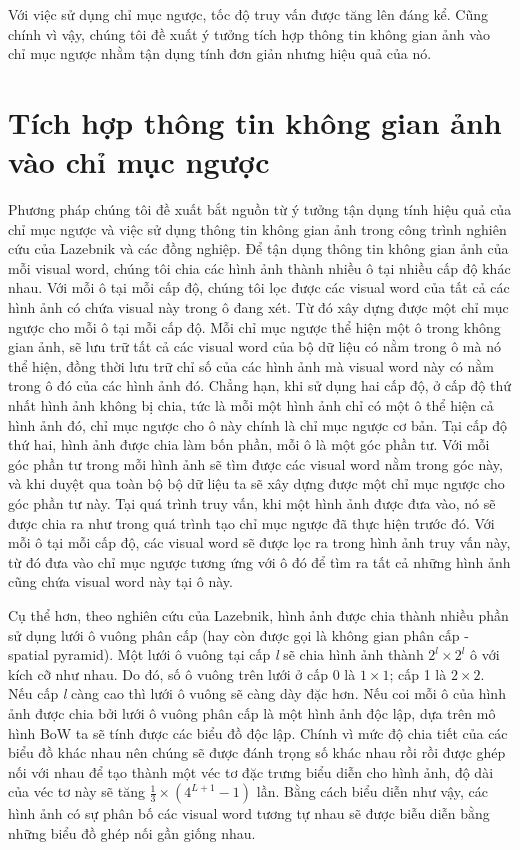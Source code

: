 Với việc sử dụng chỉ mục ngược, tốc độ truy vấn được tăng lên đáng kể. Cũng chính vì vậy, chúng tôi đề xuất ý tưởng tích hợp thông tin không gian ảnh vào chỉ mục ngược nhằm tận dụng tính đơn giản nhưng hiệu quả của nó.

\section{Tích hợp thông tin không gian ảnh vào chỉ mục ngược}
\label{sec:intergrated}
Phương pháp chúng tôi đề xuất bắt nguồn từ ý tưởng tận dụng tính hiệu quả của chỉ mục ngược và việc sử dụng thông tin không gian ảnh trong công trình nghiên cứu của Lazebnik và các đồng nghiệp\cite{lazebnik2006beyond}. Để tận dụng thông tin không gian ảnh của mỗi visual word, chúng tôi chia các hình ảnh thành nhiều ô tại nhiều cấp độ khác nhau. Với mỗi ô tại mỗi cấp độ, chúng tôi lọc được các visual word của tất cả các hình ảnh có chứa visual này trong ô đang xét. Từ đó xây dựng được một chỉ mục ngược cho mỗi ô tại mỗi cấp độ. Mỗi chỉ mục ngược thể hiện một ô trong không gian ảnh, sẽ lưu trữ tất cả các visual word của bộ dữ liệu có nằm trong ô mà nó thể hiện, đồng thời lưu trữ chỉ số của các hình ảnh mà visual word này có nằm trong ô đó của các hình ảnh đó. Chẳng hạn, khi sử dụng hai cấp độ, ở cấp độ thứ nhất hình ảnh không bị chia, tức là mỗi một hình ảnh chỉ có một ô thể hiện cả hình ảnh đó, chỉ mục ngược cho ô này chính là chỉ mục ngược cơ bản. Tại cấp độ thứ hai, hình ảnh được chia làm bốn phần, mỗi ô là một góc phần tư. Với mỗi góc phần tư trong mỗi hình ảnh sẽ tìm được các visual word nằm trong góc này, và khi duyệt qua toàn bộ bộ dữ liệu ta sẽ xây dựng được một chỉ mục ngược cho góc phần tư này. Tại quá trình truy vấn, khi một hình ảnh được đưa vào, nó sẽ được chia ra như trong quá trình tạo chỉ mục ngược đã thực hiện trước đó. Với mỗi ô tại mỗi cấp độ, các visual word sẽ được lọc ra trong hình ảnh truy vấn này, từ đó đưa vào chỉ mục ngược tương ứng với ô đó để tìm ra tất cả những hình ảnh cũng chứa visual word này tại ô này. 

Cụ thể hơn, theo nghiên cứu của Lazebnik, hình ảnh được chia thành nhiều phần sử dụng lưới ô vuông phân cấp (hay còn được gọi là không gian phân cấp - spatial pyramid). Một lưới ô vuông tại cấp \textit{l} sẽ chia hình ảnh thành $2^l \times 2^l$ ô với kích cỡ như nhau. Do đó, số ô vuông trên lưới ở cấp 0 là $1 \times 1$; cấp 1 là $2 \times 2$. Nếu cấp \textit{l} càng cao thì lưới ô vuông sẽ càng dày đặc hơn. Nếu coi mỗi ô của hình ảnh được chia bởi lưới ô vuông phân cấp là một hình ảnh độc lập, dựa trên mô hình BoW ta sẽ tính được các biểu đồ độc lập. Chính vì mức độ chia tiết của các biểu đồ khác nhau nên chúng sẽ được đánh trọng số khác nhau rồi rồi được ghép nối với nhau để tạo thành một véc tơ đặc trưng biểu diễn cho hình ảnh, độ dài của véc tơ này sẽ tăng $\frac{1}{3}\times(4^{L+1} - 1)$ lần. Bằng cách biểu diễn như vậy, các hình ảnh có sự phân bố các visual word tương tự nhau sẽ được biễu diễn bằng những biểu đồ ghép nối gần giống nhau.

